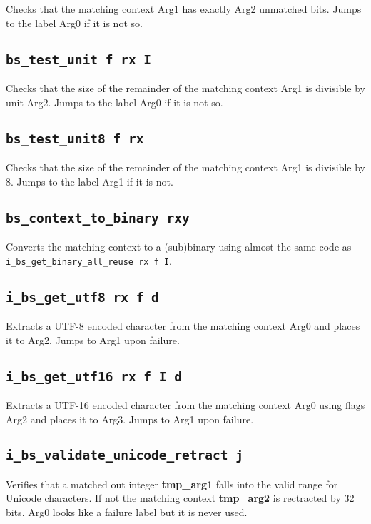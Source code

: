\documentclass{article}
\newcommand{\tmpa}{\textbf{tmp\_arg1}}
\newcommand{\tmpb}{\textbf{tmp\_arg2}}
\newcommand{\iop}[1]{\texttt{#1}}
\begin{document}
Checks that the matching context Arg1 has exactly Arg2 unmatched bits. Jumps to
the label Arg0 if it is not so.

\subsection*{\iop{bs\_test\_unit f rx I}}

Checks that the size of the remainder of the matching context Arg1 is divisible
by unit Arg2. Jumps to the label Arg0 if it is not so.

\subsection*{\iop{bs\_test\_unit8 f rx}}

Checks that the size of the remainder of the matching context Arg1 is divisible
by 8. Jumps to the label Arg1 if it is not.

\subsection*{\iop{bs\_context\_to\_binary rxy}}

Converts the matching context to a (sub)binary using almost the same code as
\iop{i\_bs\_get\_binary\_all\_reuse rx f I}.

\subsection*{\iop{i\_bs\_get\_utf8 rx f d}}

Extracts a UTF-8 encoded character from the matching context Arg0 and places it
to Arg2. Jumps to Arg1 upon failure.

\subsection*{\iop{i\_bs\_get\_utf16 rx f I d}}

Extracts a UTF-16 encoded character from the matching context Arg0 using flags
Arg2 and places it to Arg3. Jumps to Arg1 upon failure.

\subsection*{\iop{i\_bs\_validate\_unicode\_retract j}}

Verifies that a matched out integer \tmpa{} falls into the valid range for
Unicode characters. If not the matching context \tmpb{} is rectracted by 32
bits. Arg0 looks like a failure label but it is never used.
\end{document}
